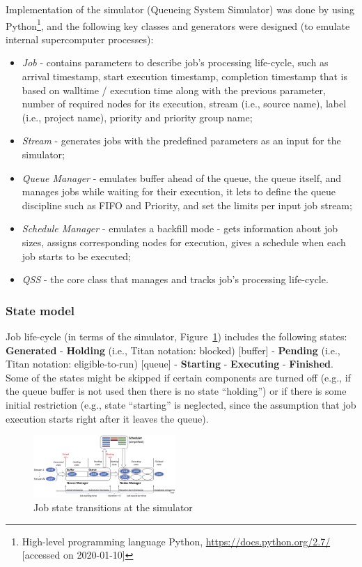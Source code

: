 Implementation of the simulator (Queueing System Simulator) \cite{ref-qss}
was done by using Python\footnote{High-level programming language Python,
\url{https://docs.python.org/2.7/} [accessed on 2020-01-10]}, and the
following key classes and generators were designed (to emulate internal
supercomputer processes):
\begin{itemize}
    \item \textit{Job} - contains parameters to describe job's processing
    life-cycle, such as arrival timestamp, start execution timestamp,
    completion timestamp that is based on walltime / execution time along
    with the previous parameter, number of required nodes for its execution,
    stream (i.e., source name), label (i.e., project name), priority and
    priority group name;
    \item \textit{Stream} - generates jobs with the predefined parameters as
    an input for the simulator;
    \item \textit{Queue Manager} - emulates buffer ahead of the queue, the
    queue itself, and manages jobs while waiting for their execution, it
    lets to define the queue discipline such as FIFO and Priority, and set
    the limits per input job stream;
    \item \textit{Schedule Manager} - emulates a backfill mode - gets
    information about job sizes, assigns corresponding nodes for execution,
    gives a schedule when each job starts to be executed;
    \item \textit{QSS} - the core class that manages and tracks job's
    processing life-cycle.
\end{itemize}

\subsubsection{State model} \label{sec-strategy-2-2}

Job life-cycle (in terms of the simulator,
Figure~\ref{fig-simulator-scheme}) includes the following states:
\textbf{Generated} - \textbf{Holding} (i.e., Titan notation: blocked)
[buffer] - \textbf{Pending} (i.e., Titan notation: eligible-to-run) [queue] -
\textbf{Starting} - \textbf{Executing} - \textbf{Finished}. Some of the
states might be skipped if certain components are turned off (e.g., if the
queue buffer is not used then there is no state ``holding'') or if there is
some initial restriction (e.g., state ``starting'' is neglected, since the
assumption that job execution starts right after it leaves the queue).

\begin{figure}
    \centering
    \includegraphics[width=0.48\textwidth]{pics/simulator-scheme.png}
    \caption{Job state transitions at the simulator}
    \label{fig-simulator-scheme} 
\end{figure}
